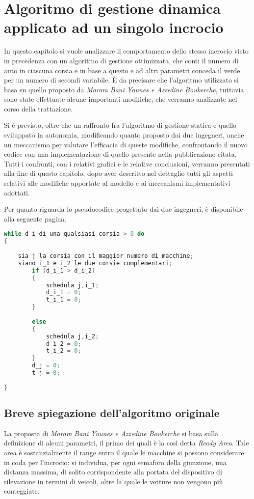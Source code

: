 \chapter{Algoritmo di gestione dinamica applicato ad un singolo incrocio \label{capitolo2}}

In questo capitolo si vuole analizzare il comportamento dello stesso incrocio visto in precedenza con un algoritmo di gestione ottimizzata, che conti il numero di auto in ciascuna corsia e in base a questo e ad altri parametri conceda il verde per un numero di secondi variabile. È da precisare che l’algoritmo utilizzato si basa su quello proposto da \textit{Maram Bani Younes e Azzedine Boukerche}\cite{itlc}, tuttavia sono state effettuate alcune importanti modifiche, che verranno analizzate nel corso della trattazione. 

Si è previsto,  oltre che un raffronto fra l'algoritmo di gestione statica e quello sviluppato in autonomia, modificando quanto proposto dai due ingegneri, anche un meccanismo per valutare l'efficacia di queste modifiche, confrontando il nuovo codice con una implementazione di quello presente nella pubblicazione citata. Tutti i confronti, con i relativi grafici e le relative conclusioni, verranno presentati alla fine di questo capitolo, dopo aver descritto nel dettaglio tutti gli aspetti relativi alle modifiche apportate al modello e ai meccanismi implementativi adottati.


Per quanto riguarda lo pseudocodice progettato dai due ingegneri, è disponibile alla seguente pagina.
\newpage
\begin{lstlisting}[language=C,label=pseudocode,caption=Pseudocodice di gestione dinamica di un incrocio]
while d_i di una qualsiasi corsia > 0 do
{
	
	sia j la corsia con il maggior numero di macchine;
	siano i_1 e i_2 le due corsie complementari;
		if (d_i_1 > d_i_2)
		{
			schedula j,i_1;
			d_i_1 = 0;
			t_i_1 = 0;
		}
		
		else
		{
			schedula j,i_2;
			d_i_2 = 0;
			t_i_2 = 0;
		}
		d_j = 0;
		t_j = 0;
	
}   
\end{lstlisting}
\newpage
\section{Breve spiegazione dell'algoritmo originale}
La proposta di \textit{Maram Bani Younes e Azzedine Boukerche} si basa sulla definizione di alcuni parametri, il primo dei quali è la così detta \textit{Ready Area}. Tale area è sostanzialmente il range entro il quale le macchine si possono considerare in coda per l’incrocio: si individua, per ogni semaforo della giunzione, una distanza massima, di solito corrispondente alla portata del dispositivo di rilevazione in termini di veicoli, oltre la quale le vetture non vengono più conteggiate. 

